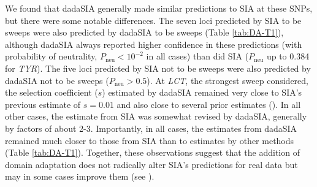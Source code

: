 We found that \ac{dadaSIA} generally made similar predictions to \ac{SIA} at these \acp{SNP}, but there were some notable differences. The seven loci predicted by SIA to be sweeps were also predicted by dadaSIA to be sweeps (Table \ref{tab:DA-T1}), although \ac{dadaSIA} always reported higher confidence in these predictions (with probability of neutrality, $P_{\mathrm{neu}}<10^{-2}$ in all cases) than did \ac{SIA} ($P_{\mathrm{neu}}$ up to 0.384 for \textit{TYR}). The five loci predicted by \ac{SIA} not to be sweeps were also predicted by \ac{dadaSIA} not to be sweeps ($P_{\mathrm{neu}}>0.5$). At \textit{LCT}, the strongest sweep considered, the selection coefficient ($s$) estimated by \ac{dadaSIA} remained very close to \ac{SIA}’s previous estimate of $s = 0.01$ and also close to several prior estimates (\cite{bersaglieri_genetic_2004,mathieson_estimating_2020,mathieson_fads1_2018}). In all other cases, the estimate from \ac{SIA} was somewhat revised by \ac{dadaSIA}, generally by factors of about 2-3. Importantly, in all cases, the estimates from \ac{dadaSIA} remained much closer to those from \ac{SIA} than to estimates by other methods (Table \ref{tab:DA-T1}). Together, these observations suggest that the addition of domain adaptation does not radically alter \ac{SIA}’s predictions for real data but may in some cases improve them (see ).

